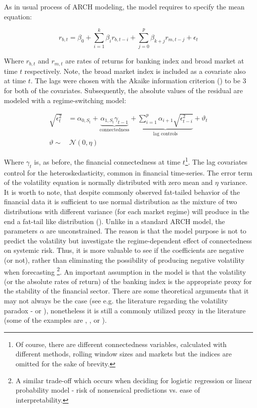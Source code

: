 \documentclass[12pt]{article}
\begin{document}
As in usual process of ARCH modeling, the model requires to specify the mean equation:

\begin{equation}
	r_{b,t} = \beta_0 + \sum_{i=1}^{k}\beta_i r_{b, t-i} + \sum_{j=0}^{p}\beta_{k+j} r_{m, t-j} + \epsilon_t	
\end{equation}

Where $r_{b,t}$ and $r_{m, t}$ are rates of returns for banking index and broad market at time $t$ respectively. Note, the broad market index is included as a covariate also at time $t$. The lags were chosen with the Akaike information criterion (\citet{akaike98}) to be 3 for both of the covariates. Subsequently, the absolute values of the residual are modeled with a regime-switching model:


\begin{align}
	\label{equation:vol_model}
\sqrt{\epsilon^{2}_t} &= \alpha_{0,S_t} + \underbrace{\alpha_{1,S_t} \gamma_{t-1}}_{\text{connectedness}} + \underbrace{\sum_{i=1}^{p} \alpha_{i+1} \sqrt{\epsilon^2_{t-i}}}_{\text{lag controls}} + \vartheta_t \\
\vartheta \sim & \, \mathcal{N}(0, \eta)
\end{align}

Where $\gamma_t$ is, as before, the financial connectedness at time $t$\footnote{Of course, there are different connectedness variables, calculated with different methods, rolling window sizes and markets but the indices are omitted for the sake of brevity.}. The lag covariates control for the heteroskedasticity, common in financial time-series. The error term of the volatility equation is normally distributed with zero mean and $\eta$ variance. It is worth to note, that despite commonly observed fat-tailed behavior of the financial data it is sufficient to use normal distribution as the mixture of two distributions with different variance (for each market regime) will produce in the end a fat-tail like distribution (\citet{timmermann00}). Unlike in a standard ARCH model, the parameters $\alpha$ are unconstrained. The reason is that the model purpose is not to predict the volatility but investigate the regime-dependent effect of connectedness on systemic risk. Thus, it is more valuable to see if the coefficients are negative (or not), rather than eliminating the possibility of producing negative volatility when forecasting \footnote{A similar trade-off which occurs when deciding for logistic regression or linear probability model - risk of nonsensical predictions vs. ease of interpretability.}. An important assumption in the model is that the volatility (or the absolute rates of return) of the banking index is the appropriate proxy for the stability of the financial sector. There are some theoretical arguments that it may not always be the case (see e.g. the literature regarding the volatility paradox - \citet{brunnermeier14} or \citet{danielsson18}), nonetheless it is still a commonly utilized proxy in the literature (some of the examples are \citet{nelson07}, \citet{bratis20}, \citet{imf08} or \citet{billio16}).
\end{document}
